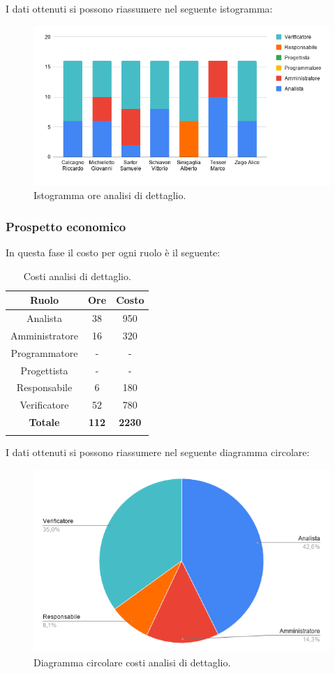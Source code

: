 I dati ottenuti si possono riassumere nel seguente istogramma:
\begin{figure}[H]
	\centering
	\includegraphics[width=0.8\linewidth]{./res/images/OreAnalisiDettaglio.png}
	\caption{Istogramma ore analisi di dettaglio.}
	\label{fig: Istogramma ore analisi di dettaglio.}
\end{figure}

\subsubsection{Prospetto economico}

In questa fase il costo per ogni ruolo è il seguente:
\begin{longtable}{|c|c|c|}
	\hline
	\rowcolor[HTML]{F9CB9C} 
	\textbf{Ruolo} & \textbf{Ore} & \textbf{Costo} \\
	\hline
	Analista &
	38 &
	950 \\
	\hline
	Amministratore &
	16 &
	320 \\
	\hline
	Programmatore &
	- &
	- \\
	\hline
	Progettista &
	- &
	- \\
	\hline
	Responsabile  &
	6 &
	180 \\
	\hline
	Verificatore &
	52 &
	780 \\
	\hline
	\rowcolor[HTML]{F9CB9C} 
	\textbf{Totale} & \textbf{112} & \textbf{2230} \\
	\hline
	\caption{Costi analisi di dettaglio.}
	\label{fig: Costi analisi di dettaglio.}
\end{longtable}

I dati ottenuti si possono riassumere nel seguente diagramma circolare:
\begin{figure}[H]
	\centering
	\includegraphics[width=0.6\linewidth]{./res/images/CostiAnalisiDettaglio.png}
	\caption{Diagramma circolare costi analisi di dettaglio.}
	\label{fig: Diagramma circolare costi analisi di dettaglio.}
\end{figure}

